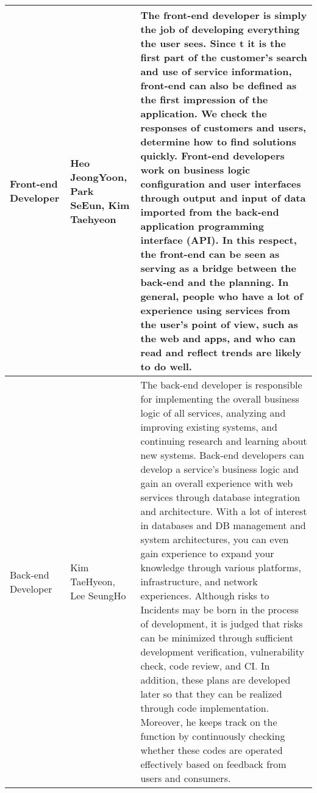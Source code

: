 \documentclass[conference]{IEEEtran}
\begin{document}
\begin{table}[htbp]
\begin{tabular}{| p{1cm}|p{1.5cm}|p{5.2cm} |}

\hline
Front-end Developer & Heo JeongYoon, Park SeEun, Kim Taehyeon & The front-end developer is simply the job of developing everything the user sees. Since t it is the first part of the customer's search and use of service information, front-end can also be defined as the first impression of the application. We check the responses of customers and users, determine how to find solutions quickly.
Front-end developers work on business logic configuration and user interfaces through output and input of data imported from the back-end application programming interface (API). In this respect, the front-end can be seen as serving as a bridge between the back-end and the planning.
In general, people who have a lot of experience using services from the user's point of view, such as the web and apps, and who can read and reflect trends are likely to do well.\\

\hline
Back-end Developer & Kim TaeHyeon, Lee SeungHo & The back-end developer is responsible for implementing the overall business logic of all services, analyzing and improving existing systems, and continuing research and learning about new systems. Back-end developers can develop a service's business logic and gain an overall experience with web services through database integration and architecture. With a lot of interest in databases and DB management and system architectures, you can even gain experience to expand your knowledge through various platforms, infrastructure, and network experiences. Although risks to Incidents may be born in the process of development, it is judged that risks can be minimized through sufficient development verification, vulnerability check, code review, and CI. In addition, these plans are developed later so that they can be realized through code implementation. Moreover, he keeps track on the function by continuously checking whether these codes are operated effectively based on feedback from users and consumers.\\


\end{tabular}
\end{table}
\end{document}
